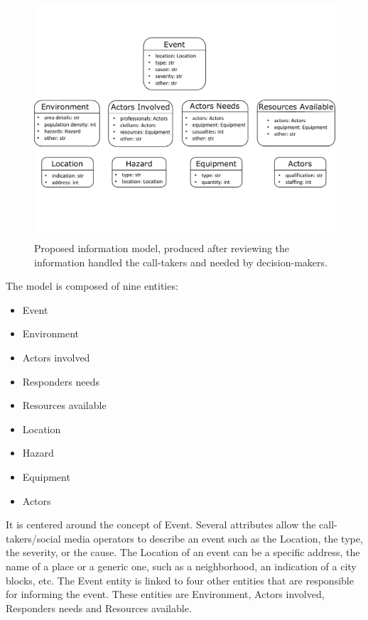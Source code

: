 \begin{figure}[htb]
    \centering
    \includegraphics[width=\textwidth]{figures/chap-3/information-needs.pdf}
    \caption{Proposed information model, produced after reviewing the information handled the call-takers and needed by decision-makers.}
    \label{information:information-models}
\end{figure}

The model is composed of nine entities:
\begin{itemize}
    \item Event
    \item Environment
    \item Actors involved
    \item Responders needs
    \item Resources available
    \item Location
    \item Hazard
    \item Equipment
    \item Actors
\end{itemize}

It is centered around the concept of Event.
Several attributes allow the call-takers/social media operators to describe an event such as
the Location, the type, the severity, or the cause.
The Location of an event can be a specific address, the name of a place or a generic one,
such as a neighborhood, an indication of a city blocks, etc.
The Event entity is linked to four other entities that are responsible for informing the event.
These entities are Environment, Actors involved, Responders needs and Resources available.

